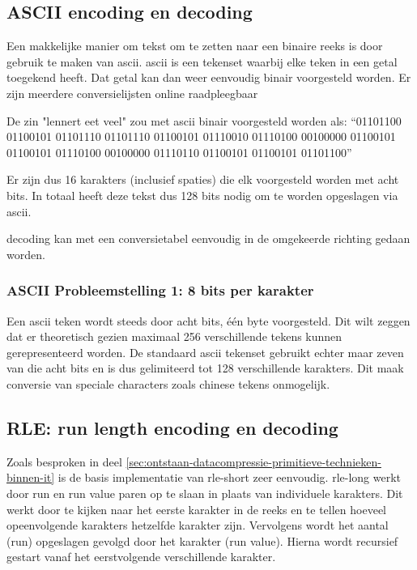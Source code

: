 \subsection{ASCII encoding en decoding}
\label{sec:primitieve-technieken-voorbeeld-ascii}
Een makkelijke manier om tekst om te zetten naar een binaire reeks is door gebruik te maken van \gls{ascii}. \Gls{ascii} is een tekenset waarbij elke teken in een getal toegekend heeft. Dat getal kan dan weer eenvoudig binair voorgesteld worden. Er zijn meerdere conversielijsten online raadpleegbaar

De zin "lennert eet veel" zou met \gls{ascii} binair voorgesteld worden als: 
“01101100 01100101 01101110 01101110 01100101 01110010 01110100 00100000 01100101 01100101 01110100 00100000 01110110 01100101 01100101 01101100”

Er zijn dus 16 karakters (inclusief spaties) die elk voorgesteld worden met acht \glspl{bit}. In totaal heeft deze tekst dus 128 \glspl{bit} nodig om te worden opgeslagen via \gls{ascii}.

\Gls{decoding} kan met een conversietabel eenvoudig in de omgekeerde richting gedaan worden. 

\subsubsection{ASCII Probleemstelling 1: 8 bits per karakter}
\label{sec:primitieve-technieken-voorbeeld-ascii-probleem-1}
Een \gls{ascii} teken wordt steeds door acht \glspl{bit}, één \gls{byte} voorgesteld. Dit wilt zeggen dat er theoretisch gezien maximaal 256 verschillende tekens kunnen gerepresenteerd worden. De standaard \gls{ascii} tekenset gebruikt echter maar zeven van die acht \glspl{bit} en is dus gelimiteerd tot 128 verschillende karakters. Dit maak conversie van speciale characters zoals chinese tekens onmogelijk.

\subsection{RLE: run length encoding en decoding}
\label{sec:primitieve-technieken-voorbeeld-rle}
Zoals besproken in deel \ref{sec:ontstaan-datacompressie-primitieve-technieken-binnen-it} is de basis implementatie van \gls{rle-short} zeer eenvoudig. \Gls{rle-long} werkt door run en run value paren op te slaan in plaats van individuele karakters. Dit werkt door te kijken naar het eerste karakter in de reeks en te tellen hoeveel opeenvolgende karakters hetzelfde karakter zijn. Vervolgens wordt het aantal (run) opgeslagen gevolgd door het karakter (run value). Hierna wordt recursief gestart vanaf het eerstvolgende verschillende karakter.

